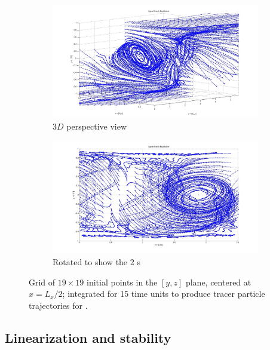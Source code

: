 \documentclass[lineno]{jfm}
\begin{document}
\begin{figure}[!h]
\centering
    \begin{subfigure}{0.98\textwidth}
    \includegraphics[width=1.0\textwidth]{fig_UB1.jpg}
      \caption{
        $3D$ perspective view
       }
      \label{fig:UBs_a}
    \end{subfigure}

    \begin{subfigure}{0.98\textwidth}
    \includegraphics[width=1.0\textwidth]{fig_UB1eq.jpg}
      \caption{
        Rotated to show the 2 \stagp s
       }
      \label{fig:UBs_b}
    \end{subfigure}
    \caption{
Grid of $19 \times 19$  initial points in the $[y,z]$ plane, centered at 
$x = L_x/2$; integrated for 15 time units to produce tracer particle 
trajectories for {\tEQtwo}.} 
\label{fig:UBs}
 \end{figure}


\subsection{Linearization and stability}
\end{document}
